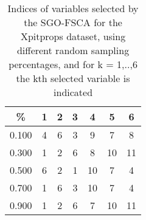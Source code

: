 \begin{table}
	\begin{center}
		\begin{tabular}{c c c c c c c}
			\% & 1 & 2 & 3 & 4 & 5 & 6 \\
			\hline
			0.100 & 4 & 6 & 3 & 9 & 7 & 8 \\
			0.300 & 1 & 2 & 6 & 8 & 10 & 11 \\
			0.500 & 6 & 2 & 1 & 10 & 7 & 4 \\
			0.700 & 1 & 6 & 3 & 10 & 7 & 4 \\
			0.900 & 1 & 2 & 6 & 7 & 10 & 11 \\
		\end{tabular}
	\end{center}
	\caption{Indices of variables selected by the SGO-FSCA for the Xpitprops dataset, using different random sampling percentages, and for k = 1,..,6 the kth selected variable is indicated}
\end{table}